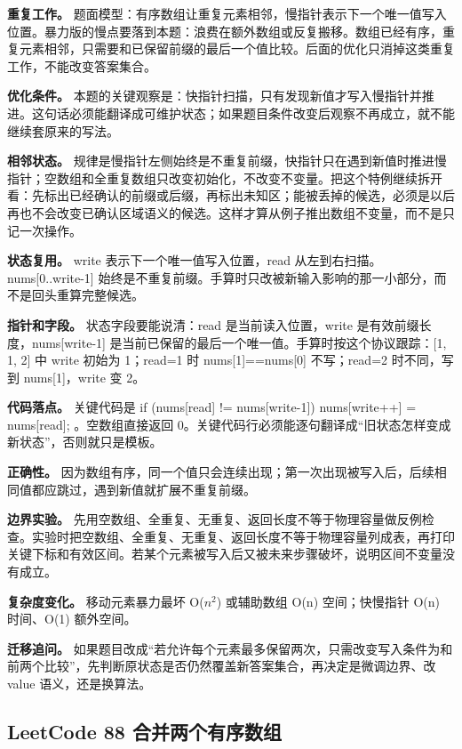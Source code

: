 \textbf{重复工作。} 题面模型：有序数组让重复元素相邻，慢指针表示下一个唯一值写入位置。暴力版的慢点要落到本题：浪费在额外数组或反复搬移。数组已经有序，重复元素相邻，只需要和已保留前缀的最后一个值比较。后面的优化只消掉这类重复工作，不能改变答案集合。

\textbf{优化条件。} 本题的关键观察是：快指针扫描，只有发现新值才写入慢指针并推进。这句话必须能翻译成可维护状态；如果题目条件改变后观察不再成立，就不能继续套原来的写法。

\textbf{相邻状态。} 规律是慢指针左侧始终是不重复前缀，快指针只在遇到新值时推进慢指针；空数组和全重复数组只改变初始化，不改变不变量。把这个特例继续拆开看：先标出已经确认的前缀或后缀，再标出未知区；能被丢掉的候选，必须是以后再也不会改变已确认区域语义的候选。这样才算从例子推出数组不变量，而不是只记一次操作。

\textbf{状态复用。} write 表示下一个唯一值写入位置，read 从左到右扫描。nums[0..write-1] 始终是不重复前缀。手算时只改被新输入影响的那一小部分，而不是回头重算完整候选。

\textbf{指针和字段。} 状态字段要能说清：read 是当前读入位置，write 是有效前缀长度，nums[write-1] 是当前已保留的最后一个唯一值。手算时按这个协议跟踪：[1, 1, 2] 中 write 初始为 1；read=1 时 nums[1]==nums[0] 不写；read=2 时不同，写到 nums[1]，write 变 2。

\textbf{代码落点。} 关键代码是 if (nums[read] != nums[write-1]) nums[write++] = nums[read]; 。空数组直接返回 0。关键代码行必须能逐句翻译成“旧状态怎样变成新状态”，否则就只是模板。

\textbf{正确性。} 因为数组有序，同一个值只会连续出现；第一次出现被写入后，后续相同值都应跳过，遇到新值就扩展不重复前缀。

\textbf{边界实验。} 先用空数组、全重复、无重复、返回长度不等于物理容量做反例检查。实验时把空数组、全重复、无重复、返回长度不等于物理容量列成表，再打印关键下标和有效区间。若某个元素被写入后又被未来步骤破坏，说明区间不变量没有成立。

\textbf{复杂度变化。} 移动元素暴力最坏 O(\ensuremath{n^{2}}) 或辅助数组 O(n) 空间；快慢指针 O(n) 时间、O(1) 额外空间。

\textbf{迁移追问。} 如果题目改成“若允许每个元素最多保留两次，只需改变写入条件为和前两个比较”，先判断原状态是否仍然覆盖新答案集合，再决定是微调边界、改 value 语义，还是换算法。

\subsection{LeetCode 88 合并两个有序数组}

